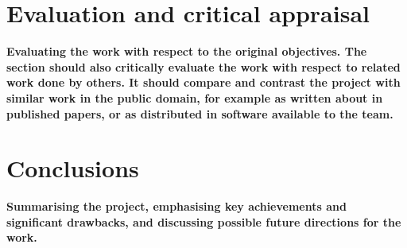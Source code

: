 \documentclass[a4paper,doc,draftfirst]{apa6}
\begin{document}
\section{Evaluation and critical appraisal}
\textbf{Evaluating the work with respect to the original objectives. The section should also critically evaluate the work with respect to related work done by others. It should compare and contrast the project with similar work in the public domain, for example as written about in published papers, or as distributed in software available to the team.}





\section{Conclusions}
\textbf{Summarising the project, emphasising key achievements and significant drawbacks, and discussing possible future directions for the work.}
\end{document}
